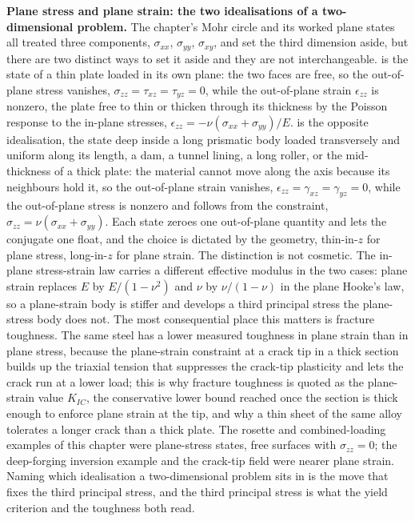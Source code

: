 \begin{mastery}
\textbf{Plane stress and plane strain: the two idealisations of a
two-dimensional problem.} The chapter's Mohr circle and its worked plane
states all treated three components, $\sigma_{xx}$, $\sigma_{yy}$,
$\sigma_{xy}$, and set the third dimension aside, but there are two
distinct ways to set it aside and they are not interchangeable.
 is the state of a thin plate loaded in its own
plane: the two faces are free, so the out-of-plane stress vanishes,
$\sigma_{zz} = \tau_{xz} = \tau_{yz} = 0$, while the out-of-plane strain
$\epsilon_{zz}$ is nonzero, the plate free to thin or thicken through its
thickness by the Poisson response to the in-plane stresses,
$\epsilon_{zz} = -\nu(\sigma_{xx} + \sigma_{yy})/E$.  is the opposite idealisation, the state deep inside a long
prismatic body loaded transversely and uniform along its length, a dam, a
tunnel lining, a long roller, or the mid-thickness of a thick plate: the
material cannot move along the axis because its neighbours hold it, so the
out-of-plane strain vanishes, $\epsilon_{zz} = \gamma_{xz} = \gamma_{yz} =
0$, while the out-of-plane stress is nonzero and follows from the
constraint, $\sigma_{zz} = \nu(\sigma_{xx} + \sigma_{yy})$. Each state
zeroes one out-of-plane quantity and lets the conjugate one float, and the
choice is dictated by the geometry, thin-in-$z$ for plane stress,
long-in-$z$ for plane strain. The distinction is not cosmetic. The
in-plane stress-strain law carries a different effective modulus in the
two cases: plane strain replaces $E$ by $E/(1-\nu^2)$ and $\nu$ by
$\nu/(1-\nu)$ in the plane Hooke's law, so a plane-strain body is
stiffer and develops a third principal stress the plane-stress body does
not. The most consequential place this matters is fracture toughness. The
same steel has a lower measured toughness in plane strain than in plane
stress, because the plane-strain constraint at a crack tip in a thick
section builds up the triaxial tension that suppresses the crack-tip
plasticity and lets the crack run at a lower load; this is why fracture
toughness is quoted as the plane-strain value $K_{IC}$, the conservative
lower bound reached once the section is thick enough to enforce plane
strain at the tip, and why a thin sheet of the same alloy tolerates a
longer crack than a thick plate. The rosette and combined-loading examples
of this chapter were plane-stress states, free surfaces with $\sigma_{zz}
= 0$; the deep-forging inversion example and the crack-tip field were
nearer plane strain. Naming which idealisation a two-dimensional problem
sits in is the move that fixes the third principal stress, and the third
principal stress is what the yield criterion and the toughness both read.
\end{mastery}

